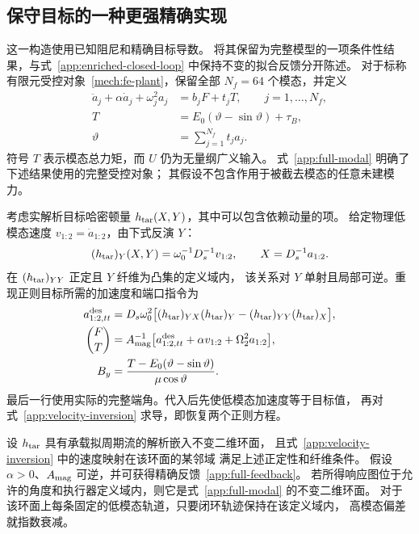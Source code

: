 \subsection{保守目标的一种更强精确实现}
\label{sm:exact-lift}
这一构造使用已知阻尼和精确目标导数。
将其保留为完整模型的一项条件性结果，与式~\eqref{app:enriched-closed-loop}
中保持不变的拟合反馈分开陈述。
对于标称有限元受控对象~\eqref{mech:fe-plant}，保留全部 $N_f=64$ 个模态，并定义
\begin{align}
 \ddot a_j+\alpha\dot a_j+\omega_j^2a_j&=b_jF+t_jT,
       \qquad j=1,\ldots,N_f,\nonumber\\
 T&=E_0(\vartheta-\sin\vartheta)+\tau_B,\nonumber\\
 \vartheta&=\sum_{j=1}^{N_f}t_ja_j.
 \label{app:full-modal}
\end{align}
符号 $T$ 表示模态总力矩，而 $U$ 仍为无量纲广义输入。
式~\eqref{app:full-modal} 明确了下述结果使用的完整受控对象；
其假设不包含作用于被截去模态的任意未建模力。

考虑实解析目标哈密顿量 $h_{\rm tar}(X,Y)$，其中可以包含依赖动量的项。
给定物理低模态速度 $v_{1:2}=\dot a_{1:2}$，由下式反演 $Y$：
\begin{equation}
 (h_{\rm tar})_Y(X,Y)=\omega_0^{-1}D_s^{-1}v_{1:2},
 \qquad X=D_s^{-1}a_{1:2}.
 \label{app:velocity-inversion}
\end{equation}
在 $(h_{\rm tar})_{YY}$ 正定且 $Y$ 纤维为凸集的定义域内，
该关系对 $Y$ 单射且局部可逆。重现正则目标所需的加速度和端口指令为
\begin{align}
 a^{\rm des}_{1:2,tt}
 &=D_s\omega_0^2\bigl[
     (h_{\rm tar})_{YX}(h_{\rm tar})_Y
       -(h_{\rm tar})_{YY}(h_{\rm tar})_X\bigr],\nonumber\\
 \binom{F}{T}
 &=A_{\rm mag}^{-1}
   \bigl[a^{\rm des}_{1:2,tt}+\alpha v_{1:2}
                        +\Omega_2^2a_{1:2}\bigr],\nonumber\\
 B_y&=\frac{T-E_0(\vartheta-\sin\vartheta)}{\mu\cos\vartheta}.
 \label{app:full-feedback}
\end{align}
最后一行使用实际的完整端角。代入后先使低模态加速度等于目标值，
再对式~\eqref{app:velocity-inversion} 求导，即恢复两个正则方程。

\begin{proposition}[条件性有限元提升]
\label{app:conditional-lift}
设 $h_{\rm tar}$ 具有承载拟周期流的解析嵌入不变二维环面，
且式~\eqref{app:velocity-inversion} 中的速度映射在该环面的某邻域
满足上述正定性和纤维条件。
假设 $\alpha>0$、$A_{\rm mag}$ 可逆，并可获得精确反馈~\eqref{app:full-feedback}。
若所得响应图位于允许的角度和执行器定义域内，则它是式~\eqref{app:full-modal} 的不变二维环面。
对于该环面上每条固定的低模态轨道，只要闭环轨迹保持在该定义域内，
高模态偏差就指数衰减。
\end{proposition}


